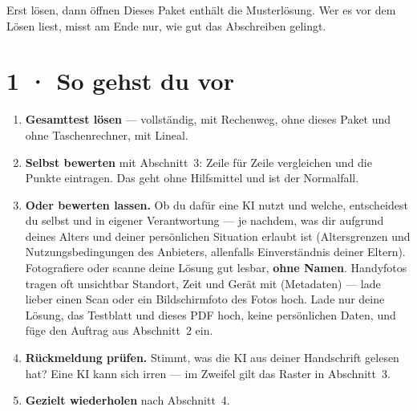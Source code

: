 \documentclass[11pt]{article}
\begin{document}

\begin{lpachtung}{Erst lösen, dann öffnen}
Dieses Paket enthält die Musterlösung. Wer es vor dem Lösen liest, misst am Ende nur, wie gut das Abschreiben gelingt.
\end{lpachtung}

\section*{1 · So gehst du vor}
\begin{enumerate}[leftmargin=*,itemsep=2pt]
\item \textbf{Gesamttest lösen} — vollständig, mit Rechenweg, ohne dieses Paket und ohne Taschenrechner, mit Lineal.
\item \textbf{Selbst bewerten} mit Abschnitt~3: Zeile für Zeile vergleichen und die Punkte eintragen. Das geht ohne Hilfsmittel
  und ist der Normalfall.
\item \textbf{Oder bewerten lassen.} Ob du dafür eine KI nutzt und welche, entscheidest du selbst und in eigener Verantwortung —
  je nachdem, was dir aufgrund deines Alters und deiner persönlichen Situation erlaubt ist (Altersgrenzen und
  Nutzungsbedingungen des Anbieters, allenfalls Einverständnis deiner Eltern). Fotografiere oder scanne deine Lösung gut lesbar,
  \textbf{ohne Namen}. Handyfotos tragen oft unsichtbar Standort, Zeit und Gerät mit (Metadaten) — lade lieber einen Scan oder ein
  Bildschirmfoto des Fotos hoch. Lade nur deine Lösung, das Testblatt und dieses PDF hoch, keine persönlichen Daten, und füge den Auftrag aus
  Abschnitt~2 ein.
\item \textbf{Rückmeldung prüfen.} Stimmt, was die KI aus deiner Handschrift gelesen hat? Eine KI kann sich irren —
  im Zweifel gilt das Raster in Abschnitt~3.
\item \textbf{Gezielt wiederholen} nach Abschnitt~4.
\end{enumerate}
\end{document}
